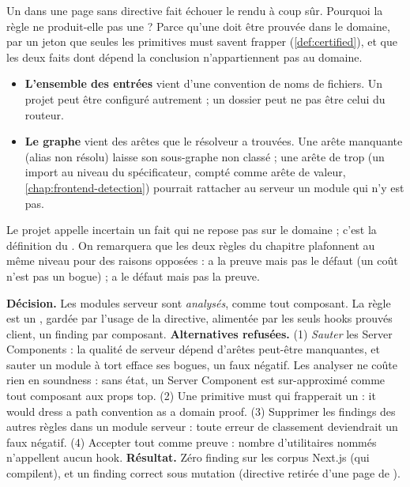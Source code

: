 Un  dans une page sans directive fait échouer le rendu à coup sûr. Pourquoi la
règle ne produit-elle pas une \Error{} ? Parce qu'une \Error{} doit être prouvée dans le domaine,
par un jeton  que seules les primitives must savent frapper
(\cref{def:certified}), et que les deux faits dont dépend la conclusion n'appartiennent pas au
domaine.
\begin{itemize}
  \item \textbf{L'ensemble des entrées} vient d'une convention de noms de fichiers. Un projet peut
        être configuré autrement ; un dossier  peut ne pas être celui du routeur.
  \item \textbf{Le graphe} vient des arêtes que le résolveur a trouvées. Une arête manquante
        (alias non résolu) laisse son sous-graphe non classé ; une arête de trop (un import
         au niveau du spécificateur, compté comme arête de valeur,
        \cref{chap:frontend-detection}) pourrait rattacher au serveur un module qui n'y est pas.
\end{itemize}
Le projet appelle \og incertain\fg{} un fait qui ne repose pas sur le domaine ; c'est la
définition du \Warning{}. On remarquera que les deux règles du chapitre plafonnent au même niveau
pour des raisons opposées :  a la preuve mais pas le défaut (un coût
n'est pas un bogue) ;  a le défaut mais pas la preuve.

\begin{decision}[ADR-026 §4]
\textbf{Décision.} Les modules serveur sont \emph{analysés}, comme tout composant. La règle est un
\Warning{}, gardée par l'usage de la directive, alimentée par les seuls hooks prouvés client, un
finding par composant.
\textbf{Alternatives refusées.} (1) \emph{Sauter} les Server Components : la qualité de serveur
dépend d'arêtes peut-être manquantes, et sauter un module à tort efface ses bogues, un faux négatif.
Les analyser ne coûte rien en soundness : sans état, un Server Component est sur-approximé comme
tout composant aux props top. (2) Une primitive must qui frapperait un  :
\og it would dress a path convention as a domain proof\fg{}. (3) Supprimer les findings des autres
règles dans un module serveur : toute erreur de classement deviendrait un faux négatif. (4)
Accepter tout  comme preuve : nombre d'utilitaires nommés  n'appellent
aucun hook.
\textbf{Résultat.} Zéro finding sur les corpus Next.js (qui compilent), et un finding correct sous
mutation (directive retirée d'une page de ).
\end{decision}


